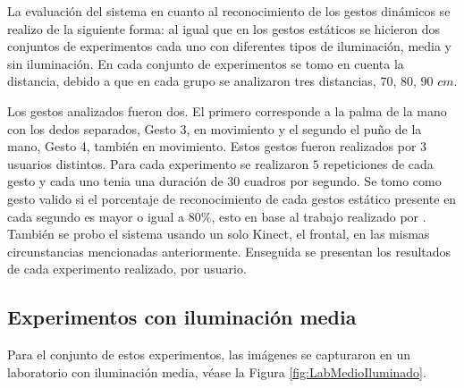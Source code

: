 La evaluación del sistema en cuanto al reconocimiento de los gestos dinámicos se realizo de la siguiente forma: al igual que en los gestos estáticos se hicieron dos conjuntos de experimentos cada uno con diferentes tipos de iluminación, media y sin iluminación. En cada conjunto de experimentos se tomo en cuenta la distancia, debido a que en cada grupo se analizaron tres distancias, $70$, $80$, $90$ $cm$. 

Los gestos analizados fueron dos. El primero corresponde a la palma de la mano con los dedos separados, Gesto 3, en movimiento y el segundo el puño de la mano, Gesto 4, también en movimiento. Estos gestos fueron realizados por $3$ usuarios distintos. Para cada experimento se realizaron $5$ repeticiones de cada gesto y cada uno tenia una duración de $30$ cuadros por segundo. Se tomo como gesto valido si el porcentaje de reconocimiento de cada gestos estático presente en cada segundo es mayor o igual a $80 \%$, esto en base al trabajo realizado por \citep{Sultana2012}. \\
También se probo el sistema usando un solo Kinect, el frontal, en las mismas circunstancias mencionadas anteriormente. 
Enseguida se presentan los resultados de cada experimento realizado, por usuario. 


\subsection{Experimentos con iluminación media} 
Para el conjunto de estos experimentos, las imágenes se capturaron en un laboratorio con iluminación media, véase la Figura \ref{fig:LabMedioIluminado}.

